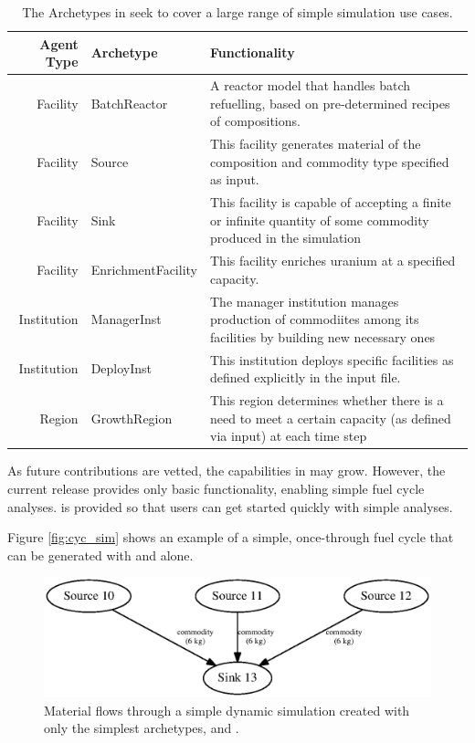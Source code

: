 \begin{table}
\centering
\begin{tabularx}{\textwidth}{|r|l|l|}
\hline
\textbf{Agent Type} & \textbf{Archetype} & \textbf{Functionality} \\
\hline
Facility & BatchReactor & A reactor model that handles batch refuelling, based on pre-determined recipes of compositions. \\
Facility & Source & This facility generates material of the composition and commodity type specified as input.  \\
Facility & Sink & This facility is capable of accepting a finite or infinite quantity of some commodity produced in the simulation \\
Facility & EnrichmentFacility & This facility enriches uranium at a specified capacity. \\
Institution& ManagerInst & The manager institution manages production of commodiites among its facilities by building new necessary ones \\
Institution & DeployInst &  This institution deploys specific facilities as defined explicitly in the input file. \\
Region & GrowthRegion & This region determines whether there is a need to meet a certain capacity (as defined via input) at each time step \\
\hline
\end{tabularx}
\caption{The Archetypes in \Cycamore seek to cover a large range of simple simulation use cases.}
\label{tab:cycamore}
\end{table}

As future contributions are vetted, the capabilities in \Cycamore may grow. 
However, the current \Cycamore release provides only 
basic functionality, enabling simple fuel cycle analyses. 
\Cycamore is provided so that users can get started quickly with simple 
analyses.

Figure \ref{fig:cyc_sim} shows an example of a simple, once-through fuel cycle 
that can be generated with \Cycamore and \Cyclus alone.

\begin{figure}[htbp!]
\begin{center}
\includegraphics{./images/simplesim}
\end{center}
\caption{Material flows through a simple dynamic simulation created with only the simplest \Cycamore archetypes,  and .}
\label{fig:simplesim}
\end{figure}
